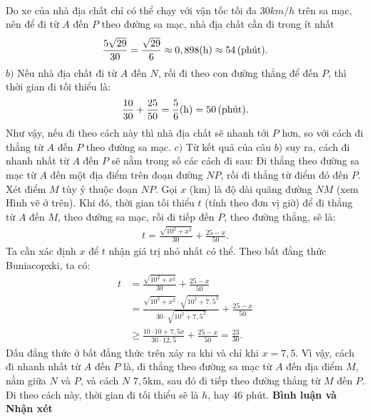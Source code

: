 \begin{multicols}{2}
\begin{align*}
	\end{align*}
	Do xe của nhà địa chất chỉ có thể chạy với vận tốc tối đa $30km/h$ trên sa mạc, nên để đi từ $A$ đến $P$ theo đường sa mạc, nhà địa chất cần đi trong ít nhất
	\begin{align*}
		\frac{{5\sqrt {29} }}{{30}} = \frac{{\sqrt {29} }}{6} \approx 0,898({\rm{h}}) \approx 54 \,(\text{\color{black}phút}).
	\end{align*}
	$b)$ Nếu nhà địa chất đi từ $A$ đến $N$, rồi đi theo con đường thẳng để đến $P$, thì thời gian đi tối thiểu là:
	\begin{align*}
		\frac{{10}}{{30}} + \frac{{25}}{{50}} = \frac{5}{6}({\rm{h}}) = 50 \,(\text{\color{black}phút}).
	\end{align*}
	Như vậy, nếu đi theo cách này thì nhà địa chất sẽ nhanh tới $P$ hơn, so với cách đi thẳng từ $A$ đến $P$ theo đường sa mạc.
	\vskip 0.05cm
	$c)$ Từ kết quả của câu $b)$ suy ra, cách đi nhanh nhất từ $A$ đến $P$ sẽ nằm trong số các cách đi sau: Đi thẳng theo đường sa mạc từ $A$ đến một địa điểm trên đoạn đường $NP$, rồi đi thẳng từ điểm đó đến $P$.
	\vskip 0.05cm
	Xét điểm $M$ tùy ý thuộc đoạn $NP$. Gọi $x$ (km) là độ dài quãng đường $NM$ (xem Hình vẽ ở trên). Khi đó, thời gian tối thiểu $t$ (tính theo đơn vị giờ) để đi thẳng từ $A$ đến $M$, theo đường sa mạc, rồi đi tiếp đến $P$, theo đường thẳng, sẽ là:
	\begin{align*}
		t = \frac{{\sqrt {{{10}^2} + {x^2}} }}{{30}} + \frac{{25 - x}}{{50}}.
	\end{align*}
	Ta cần xác định $x$ để $t$ nhận giá trị nhỏ nhất có thể.
	\vskip 0.05cm
	Theo bất đẳng thức Buniacopxki, ta có:
	\begin{align*}
			t &= \frac{{\sqrt {{{10}^2} + {x^2}} }}{{30}} + \frac{{25 - x}}{{50}} \\
			&= \frac{{\sqrt {{{10}^2} + {x^2}}  \cdot \sqrt {{{10}^2} + 7,{5^2}} }}{{30 \cdot \sqrt {{{10}^2} + 7,{5^2}} }} + \frac{{25 - x}}{{50}}\\
			 &\ge \frac{{10 \cdot 10 + 7,5x}}{{30 \cdot 12,5}} + \frac{{25 - x}}{{50}} = \frac{{23}}{{30}}.
	\end{align*}
	Dấu đẳng thức ở bất đẳng thức trên xảy ra khi và chỉ khi $x = 7,5$.
	\vskip 0.05cm
	Vì vậy, cách đi nhanh nhất từ $A$ đến $P$ là, đi thẳng theo đường sa mạc từ $A$ đến địa điểm $M$, nằm giữa $N$ và $P$, và cách $N$ $7,5$km, sau đó đi tiếp theo đường thẳng từ $M$ đến $P$. Đi theo cách này, thời gian đi tối thiểu sẽ là $h$, hay $46$ phút.
	\vskip 0.05cm
	\textbf{\color{thachthuctoanhoc}Bình luận và Nhận xét}
	\vskip 0.05cm

\end{multicols}
